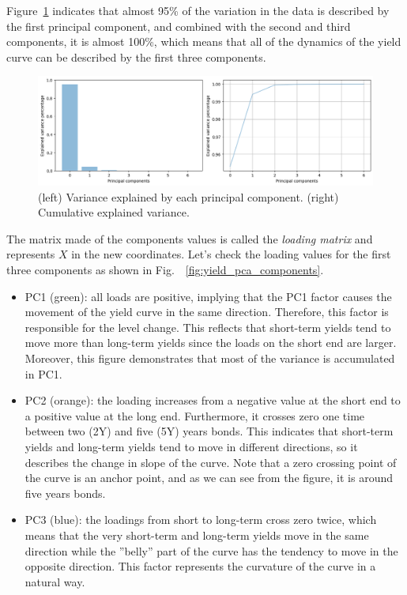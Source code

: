 Figure~\ref{fig:pca_explained_variance} indicates that almost 95\% of the variation in the data is described by the first principal component, and combined with the second and third components, it is almost 100\%, which means that all of the dynamics of the yield curve can be described by the first three components.

\begin{figure}[hbtp]
	\centering
	\includegraphics[width=0.8\linewidth]{figures/pca_explained_variance}
	\caption{(left) Variance explained by each principal component. (right) Cumulative explained variance.}
	\label{fig:pca_explained_variance}
\end{figure}

The matrix made of the components values is called the \emph{loading matrix} and represents $X$ in the new coordinates.
Let's check the loading values for the first three components as shown in Fig.~~\ref{fig:yield_pca_components}.
 
\begin{itemize}
\item PC1 (green): all loads are positive, implying that the PC1 factor causes the movement of the yield curve in the same direction. Therefore, this factor is responsible for the level change. This reflects that short-term yields tend to move more than long-term yields since the loads on the short end are larger. Moreover, this figure demonstrates that most of the variance is accumulated in PC1.
\item PC2 (orange): the loading increases from a negative value at the short end to a positive value at the long end. Furthermore, it crosses zero one time between two (2Y) and five (5Y) years bonds. This indicates that short-term yields and long-term yields tend to move in different directions, so it describes the change in slope of the curve. Note that a zero crossing point of the curve is an anchor point, and as we can see from the figure, it is around five years bonds.
\item PC3 (blue): the loadings from short to long-term cross zero twice, which means that the very short-term and long-term yields move in the same direction while the ”belly” part of the curve has the tendency to move in the opposite direction. This factor represents the curvature of the curve in a natural way.
\end{itemize}
	
